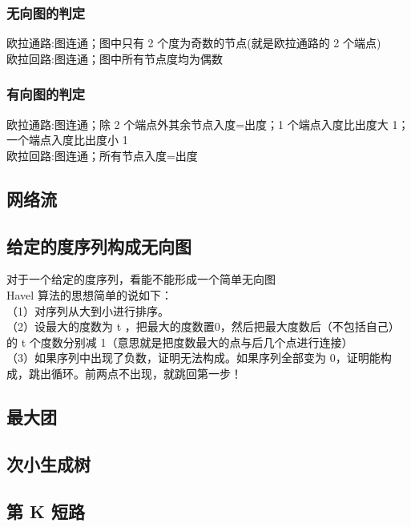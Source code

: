 \documentclass[a4paper]{article}
\begin{document}
\begin{CJK*}{UTF8}{gbsn}
\begin{multicols}{3}
\begin{flushleft}
\subsubsection{无向图的判定}
欧拉通路:图连通；图中只有 2 个度为奇数的节点(就是欧拉通路的 2 个端点)\\
欧拉回路:图连通；图中所有节点度均为偶数\\

\subsubsection{有向图的判定}
欧拉通路:图连通；除 2 个端点外其余节点入度=出度；1 个端点入度比出度大 1；一个端点入度比出度小 1\\
欧拉回路:图连通；所有节点入度=出度\\

\subsection{网络流}


\subsection{给定的度序列构成无向图}
对于一个给定的度序列，看能不能形成一个简单无向图\\
 Havel 算法的思想简单的说如下：\\
 （1）对序列从大到小进行排序。\\
 （2）设最大的度数为 t ，把最大的度数置0，然后把最大度数后（不包括自己）的 t 个度数分别减 1（意思就是把度数最大的点与后几个点进行连接）\\
 （3）如果序列中出现了负数，证明无法构成。如果序列全部变为 0，证明能构成，跳出循环。前两点不出现，就跳回第一步！\\


\subsection{最大团}


\subsection{次小生成树}


\subsection{第 K 短路}



\end{flushleft}
\end{multicols}
\end{CJK*}
\end{document}
